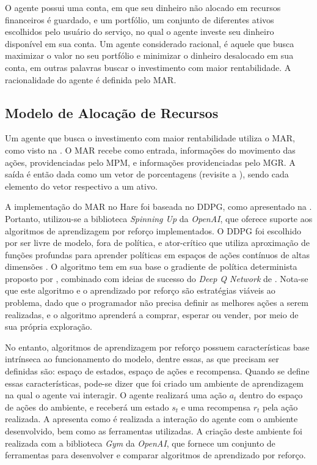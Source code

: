 O agente possui uma conta, em que seu dinheiro não alocado em recursos financeiros é guardado, e um portfólio, um conjunto de diferentes ativos escolhidos pelo usuário do serviço, no qual o agente investe seu dinheiro disponível em sua conta. Um agente considerado racional, é aquele que busca maximizar o valor no seu portfólio e minimizar o dinheiro desalocado em sua conta, em outras palavras buscar o investimento com maior rentabilidade. A racionalidade do agente é definida pelo \acrlong{MAR}.

\subsection{Modelo de Alocação de Recursos}

Um agente que busca o investimento com maior rentabilidade utiliza o \acrfull{MAR}, como visto na . O \acrshort{MAR} recebe como entrada, informações do movimento das ações, providenciadas pelo \acrlong{MPM}, e informações providenciadas pelo \acrshort{MGR}. A saída é então dada como um vetor de porcentagens (revisite a ), sendo cada elemento do vetor respectivo a um ativo.

A implementação do \acrshort{MAR} no Hare foi baseada no \acrshort{DDPG}, como apresentado na . Portanto, utilizou-se a biblioteca \emph{Spinning Up} da \textit{OpenAI}, que oferece suporte aos algoritmos de aprendizagem por reforço implementados. O \acrshort{DDPG} foi escolhido por ser livre de modelo, fora de política, e ator-crítico que utiliza aproximação de funções profundas para aprender políticas em espaços de ações contínuos de altas dimensões \cite{ddpg}. O algoritmo tem em sua base o gradiente de política determinista proposto por \textcite{silver2014deterministic}, combinado com ideias de sucesso do \textit{Deep Q Network} de \textcite{mnih2013playing}. Nota-se que este algoritmo e o aprendizado por reforço são estratégias viáveis ao problema, dado que o programador não precisa definir as melhores ações a serem realizadas, e o algoritmo aprenderá a comprar, esperar ou vender, por meio de sua própria exploração.

%

No entanto, algoritmos de aprendizagem por reforço possuem características base intrínseca ao funcionamento do modelo, dentre essas, as que precisam ser definidas são: espaço de estados, espaço de ações e recompensa. Quando se define essas características, pode-se dizer que foi criado um ambiente de aprendizagem na qual o agente vai interagir. O agente realizará uma ação $a_t$ dentro do espaço de ações do ambiente, e receberá um estado $s_t$ e uma recompensa $r_t$ pela ação realizada. A  apresenta como é realizada a interação do agente com o ambiente desenvolvido, bem como as ferramentas utilizadas. A criação deste ambiente foi realizada com a biblioteca \textit{Gym} da \textit{OpenAI}, que fornece um conjunto de ferramentas para desenvolver e comparar algoritmos de aprendizado por reforço.

